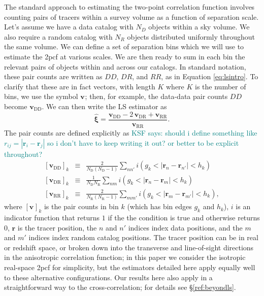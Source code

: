 \documentclass[modern]{aastex62}
\newcommand{\cf}{2pcf\xspace} %
\newcommand{\LS}{LS\xspace}
\newcommand{\bld}[1]{\bm{#1}} %
\newcommand{\vv}[1]{\bld{v}_\mathrm{#1}}
\newcommand{\NN}[1]{N_\mathrm{#1}}
\newcommand{\KSF}[1]{\textcolor{teal}{KSF says: #1}}
\begin{document}
The standard approach to estimating the two-point correlation function involves counting pairs of tracers within a survey volume as a function of separation scale.
Let's assume we have a data catalog with $N_D$ objects within a sky volume.
We also require a random catalog with $N_R$ objects distributed uniformly throughout the same volume.
We can define a set of separation bins which we will use to estimate the \cf at various scales.
We are then ready to sum in each bin the relevant pairs of objects within and across our catalogs.
In standard notation, these pair counts are written as $DD$, $DR$, and $RR$, as in Equation \ref{eq:lsintro}.
To clarify that these are in fact vectors, with length $K$ where $K$ is the number of bins, we use the symbol $\vv{}$; then, for example, the data-data pair counts $DD$ become $\vv{DD}$.
We can then write the \LS estimator as 
\begin{equation} \label{eq:lsintro}
    \bld{\hat{\xi}} = \frac{\vv{DD} - 2\,\vv{DR} + \vv{RR}}{\vv{RR}}.
\end{equation}
The pair counts are defined explicitly as
\KSF{should i define something like $r_{ij} = |\bld{r}_{i} - \bld{r}_{j}|$ so i don't have to keep writing it out? or better to be explicit throughout?}
\begin{eqnarray}\displaystyle
\label{eq:ls1}
\left[ \vv{DD} \right]_k &\equiv& \frac{2}{\NN{D}(\NN{D}-1)} \sum_{n n'} i(g_k < |\bld{r}_n - \bld{r}_{n'}| < h_k) \\ 
\left[ \vv{DR} \right]_k &\equiv& \frac{1}{\NN{D} \NN{R}} \sum_{n m} i(g_k < |\bld{r}_n - \bld{r}_m| < h_k) \\
\label{eq:ls3}
\left[ \vv{RR} \right]_k &\equiv& \frac{2}{\NN{R}(\NN{R}-1)} \sum_{m m'} i(g_k < |\bld{r}_m - \bld{r}_{m'}| < h_k),
\end{eqnarray}
where $\left[ \vv{} \right]_k$ is the pair counts in bin $k$ (which has bin edges $g_k$ and $h_k$), $i$ is an indicator function that returns $1$ if the the condition is true and otherwise returns $0$, $\bld{r}$ is the tracer position, the $n$ and $n'$ indices index data positions, and the $m$ and $m'$ indices index random catalog positions.
The tracer position can be in real or redshift space, or broken down into the transverse and line-of-sight directions in the anisotropic correlation function; in this paper we consider the isotropic real-space \cf for simplicity, but the estimators detailed here apply equally well to these alternative configurations.
Our results here also apply in a straightforward way to the cross-correlation; for details see \S\ref{ref:beyondls}. 
 
\end{document}
